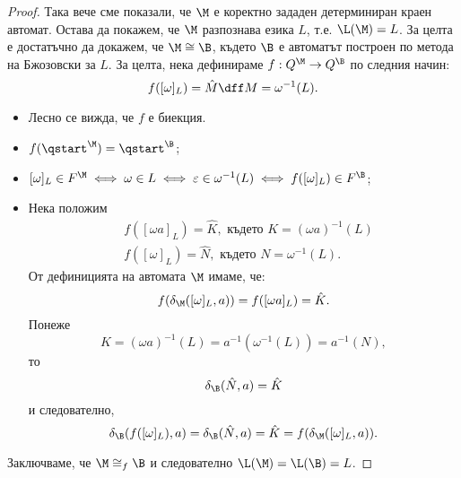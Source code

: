 \begin{proof}
  Така вече сме показали, че $\M$ е коректно зададен детерминиран краен автомат.
  Остава да покажем, че $\M$ разпознава езика $L$, т.е. $\L(\M) = L$.
  За целта е достатъчно да докажем, че $\M \cong \B$, където $\B$ е автоматът построен по метода на Бжозовски за $L$.
  За целта, нека дефинираме $f:Q^\M \to Q^\B$ по следния начин:
  \[f([\omega]_L) = \hat{M} \dff M = \omega^{-1}(L).\] 
  \begin{itemize}
  \item
    Лесно се вижда, че $f$ е биекция.
  \item
    $f(\qstart^\M) = \qstart^\B$;
  \item
    $[\omega]_L \in F^\M \iff \omega \in L \iff \varepsilon \in \omega^{-1}(L) \iff f([\omega]_L) \in F^\B$;
  \item
    Нека положим
    \begin{align*}
      & f([\omega a]_L) = \hat{K}, \text{ където }K = (\omega a)^{-1}(L)\\
      & f([\omega]_L) = \hat{N}, \text{ където }N = \omega^{-1}(L).
    \end{align*}
    От дефиницията на автомата $\M$ имаме, че:
    \[f(\delta_\M([\omega]_L,a)) = f([\omega a]_L) = \hat{K}.\]
    Понеже
    \[K = (\omega a)^{-1}(L) = a^{-1}(\omega^{-1}(L)) = a^{-1}(N),\]
    то
    \[\delta_\B(\hat{N},a) = \hat{K}\]
    и следователно,
    \[\delta_\B(f([\omega]_L),a) = \delta_\B(\hat{N},a) = \hat{K} = f(\delta_\M([\omega]_L,a)).\]
  \end{itemize}
  Заключваме, че $\M \cong_f \B$ и следователно $\L(\M) = \L(\B) = L$.
  

\end{proof}
